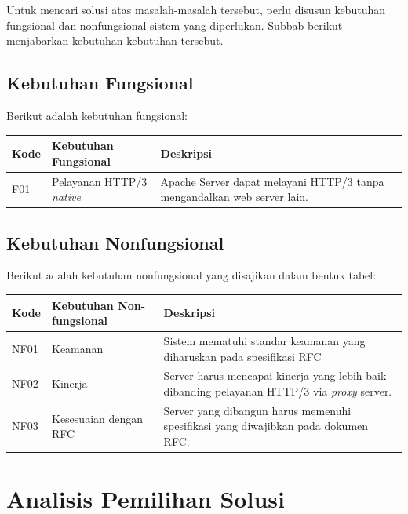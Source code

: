 Untuk mencari solusi atas masalah-masalah tersebut, perlu disusun kebutuhan fungsional dan nonfungsional sistem yang diperlukan. Subbab berikut menjabarkan kebutuhan-kebutuhan tersebut.
\vspace{2cm}
\subsection{Kebutuhan Fungsional}
Berikut adalah kebutuhan fungsional:
\begin{table}[h]
\begin{tabular}{|p{}|p{}|p{}|}
\hline
\textbf{Kode} & \textbf{Kebutuhan Fungsional} & \textbf{Deskripsi}
\\
\hline
F01 & Pelayanan HTTP/3 \textit{native} & Apache Server dapat melayani HTTP/3 tanpa mengandalkan web server lain. \\
\hline

\end{tabular}
\end{table}
\subsection{Kebutuhan Nonfungsional}
Berikut adalah kebutuhan nonfungsional yang disajikan dalam bentuk tabel:

\begin{table}[h]
\begin{tabular}{|p{}|p{}|p{}|}
\hline
\textbf{Kode} & \textbf{Kebutuhan Non-fungsional} & \textbf{Deskripsi}
\\
\hline
NF01 & Keamanan & Sistem mematuhi standar keamanan yang diharuskan pada spesifikasi RFC \\
\hline
NF02 & Kinerja & Server harus mencapai kinerja yang lebih baik dibanding pelayanan HTTP/3 via \textit{proxy} server. \\
\hline
NF03 & Kesesuaian dengan RFC & Server yang dibangun harus memenuhi spesifikasi yang diwajibkan pada dokumen RFC. \\
\hline

\end{tabular}
\end{table}

\section{Analisis Pemilihan Solusi}
